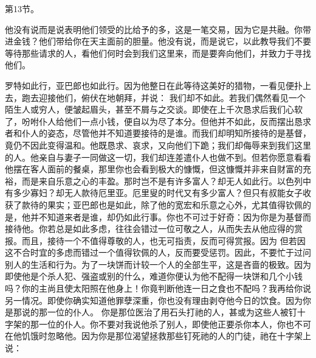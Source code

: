 第13节。\par

他没有说而是说表明他们领受的比给予的多，这是一笔交易，因为它是共融。你带进金钱？他们带给你在天主面前的胆量。他没有说，而是说它，以此教导我们不要等待那些请求的人，看他们何时会到我们这里来，而是要奔向他们，并致力于寻找他们。\par

罗特如此行，亚巴郎也如此行。因为他整日在此等待这美好的猎物，一看见便扑上去，跑去迎接他们，俯伏在地朝拜，并说： 我们却不如此。若我们偶然看见一个陌生人或穷人，便皱起眉头，甚至不屑与之交谈。即使在上千次恳求后我们心软了，吩咐仆人给他们一点小钱，便自以为尽了本分。但他并不如此，反而摆出恳求者和仆人的姿态，尽管他并不知道要接待的是谁。而我们却明知所接待的是基督，竟仍不因此变得温和。他既恳求、哀求，又向他们下跪；我们却侮辱来到我们这里的人。他亲自与妻子一同做这一切，我们却连差遣仆人也做不到。但若你愿意看看他摆在客人面前的餐桌，那里你也会看到极大的慷慨，但这慷慨并非来自财富的充裕，而是来自乐意之心的丰盈。那时岂不是有许多富人？却无人如此行。以色列中有多少寡妇？却无人款待厄里亚。厄里叟的时代又有多少富人？但只有叔能女子收获了款待的果实；亚巴郎也是如此，除了他的宽宏和乐意之心外，尤其值得钦佩的是，他并不知道来者是谁，却仍如此行事。你也不可过于好奇：因为你是为基督而接待他。你若总是如此多虑，往往会错过一位可敬之人，从而失去从他应得的赏报。而且，接待一个不值得尊敬的人，也无可指责，反而可得赏报。因为 但若因这不合时宜的多虑而错过一个值得钦佩的人，反而要受惩罚。因此，不要忙于过问别人的生活和行为。为了一块饼而计较一个人的全部生平，这是吝啬的极致。因为即使他是个杀人犯、强盗或别的什么，难道你便认为他不配得一块饼和几个小钱吗？你的主尚且使太阳照在他身上！你竟判断他连一日之食也不配吗？我再给你说另一情况。即使你确实知道他罪孽深重，你也没有理由剥夺他今日的饮食。因为你是那说的那一位的仆人。 你是那位医治了用石头打祂的人，甚或为这些人被钉十字架的那一位的仆人。你不要对我说他杀了别人，即使他正要杀你本人，你也不可在他饥饿时忽略他。因为你是那位渴望拯救那些钉死祂的人的门徒，祂在十字架上说： 